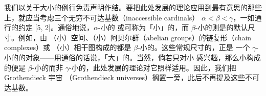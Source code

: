 我们以关于大小的例行免责声明作结。要把此处发展的理论应用到最有意思的那些%
\trInfinityCategory{}上，就应当考虑三个无穷不可达基数（inaccessible cardinals）
$\alpha<\beta<\gamma$，一如通行的约定 [5, 2]。通俗地说，$\alpha$-小的\trCategory
或可称为「小」的，而 $\beta$-小的\trCategory{}则是\trInfinityCategory{}的默认尺寸。例如，由
（小）空间、（小）阿贝尔群（abelian groups）的链复形（chain complexes）或
（小）\trHomotopy{}相干图构成的\trInfinityCategory{}都是 $\beta$-小的。这些常规尺寸的\trInfinityCategory{}，正是
一个 $\gamma$-小的\trInfinityCosmos{}的对象——用通俗的话说，「大」的。当然，倘若只对小%
\trSimplicialSet{}感兴趣，那么小\trQuasiCategory{}构成的\trInfinityCosmos{}便是 $\beta$-小的而非
$\gamma$-小的，此处发展的理论对它照样适用。因此，我们把 Grothendieck 宇宙
（Grothendieck universes）搁置一旁，此后不再提及这些不可达基数。
